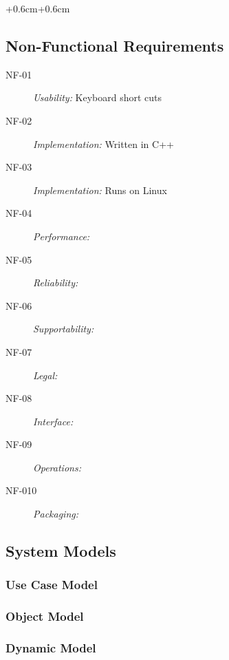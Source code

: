 \documentclass[english]{article}
\begin{document}
\begin{adjustwidth*}{+0.6cm}{+0.6cm}
\subsection{Non-Functional Requirements}
\begin{description}
\item[NF-01] {\large{}\textit{Usability:} Keyboard short cuts}{\large \par}
\item[NF-02] {\large{}\textit{Implementation:} Written in C++}{\large \par}
\item[NF-03] {\large{}\textit{Implementation:} Runs on Linux}{\large \par}
\item[NF-04] {\large{}\textit{Performance:} }{\large \par}
\item[NF-05] {\large{}\textit{Reliability:}}{\large \par}
\item[NF-06] {\large{}\textit{Supportability:}}{\large \par}
\item[NF-07] {\large{}\textit{Legal:}}{\large \par}
\item[NF-08] {\large{}\textit{Interface:}}{\large \par}
\item[NF-09] {\large{}\textit{Operations:}}{\large \par}
\item[NF-010] {\large{}\textit{Packaging:}}{\large \par}
\end{description}

\subsection{System Models}


\subsubsection{Use Case Model}


\subsubsection{Object Model}


\subsubsection{Dynamic Model}



\end{adjustwidth*}
\end{document}
